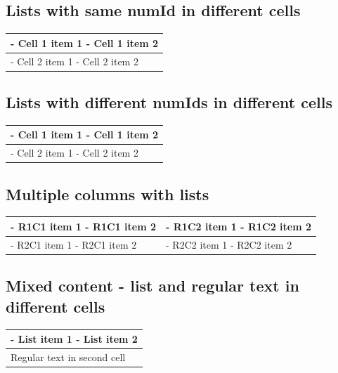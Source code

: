 \documentclass[11pt,a4paper]{article}
\begin{document}
\subsection{Lists with same numId in different cells}

\begin{table}[h]
\begin{tabular}{|l|}
\hline
- Cell 1 item 1 - Cell 1 item 2 \\ \hline
- Cell 2 item 1 - Cell 2 item 2 \\ \hline
\end{tabular}
\end{table}

\subsection{Lists with different numIds in different cells}

\begin{table}[h]
\begin{tabular}{|l|}
\hline
- Cell 1 item 1 - Cell 1 item 2 \\ \hline
- Cell 2 item 1 - Cell 2 item 2 \\ \hline
\end{tabular}
\end{table}

\subsection{Multiple columns with lists}

\begin{table}[h]
\begin{tabular}{|l|l|}
\hline
- R1C1 item 1 - R1C1 item 2 & - R1C2 item 1 - R1C2 item 2 \\ \hline
- R2C1 item 1 - R2C1 item 2 & - R2C2 item 1 - R2C2 item 2 \\ \hline
\end{tabular}
\end{table}

\subsection{Mixed content - list and regular text in different cells}

\begin{table}[h]
\begin{tabular}{|l|}
\hline
- List item 1 - List item 2 \\ \hline
Regular text in second cell \\ \hline
\end{tabular}
\end{table}
\end{document}

